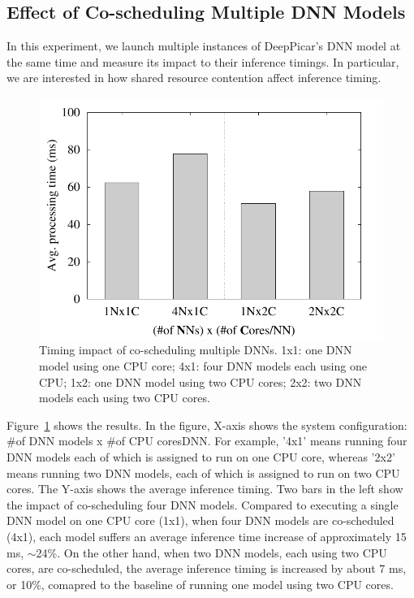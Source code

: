 \subsection{Effect of Co-scheduling Multiple DNN Models}

In this experiment, we launch multiple instances of DeepPicar's DNN
model at the same time and measure its impact to their inference
timings. In particular, we are interested in how shared resource
contention affect inference timing.


\begin{figure}[h]
  \centering
  \includegraphics[width=.45\textwidth]{figs/perf_vs_modelcnt}
  \caption{Timing impact of co-scheduling multiple DNNs. 1x1: one DNN
    model using one CPU core; 4x1: four DNN models each using one CPU;
    1x2: one DNN model using two CPU cores; 2x2: two DNN models each
    using two CPU cores.} 
  \label{fig:perf-vs-modelcnt}
\end{figure}



Figure~\ref{fig:perf-vs-modelcnt} shows the results. In the figure,
X-axis shows the system configuration: \#of DNN models x \#of CPU
cores\/DNN. For example, '4x1' means running four DNN models each of
which is assigned to run on one CPU core, whereas '2x2' means running
two DNN models, each of which is assigned to run on two CPU
cores. The Y-axis shows the average inference timing.
Two bars in the left show the impact of co-scheduling four DNN
models. Compared to executing a single DNN model on one CPU core
(1x1), when four DNN models are co-scheduled (4x1), each model
suffers an average inference time increase of approximately 15 ms,
$\sim$24\%. On the other hand, when two DNN models, each using two CPU
cores, are co-scheduled, the average inference timing is increased by
about 7 ms, or 10\%, comapred to the baseline of running one model
using two CPU cores. 

